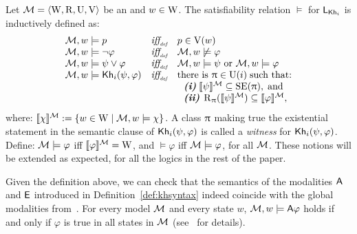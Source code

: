 \begin{definition}\label{def:sem-esm}
Let $\mathcal{M}=\langle \operatorname{W},\operatorname{R},\operatorname{U},\operatorname{V} \rangle$ be an \ults and $w \in \operatorname{W}$.
The satisfiability relation $\models$ for $\mathsf{L}_{{\sf Kh}_i}$ is inductively defined as:
\[
\begin{array}{l@{\ \ \ }c@{\ \ \  }l}
\modults, w \models p & \iffdef & p \in \V(w) \\
\modults, w \models \neg\varphi & \iffdef & \modults, w \not\models \varphi \\
\modults, w \models \psi\vee\varphi & \iffdef & \modults, w \models \psi \mbox{ or }\modults, w \models \varphi \\
\modults, w \models \khi(\psi,\varphi) & \iffdef & \text{there is } \plans \in \Unc(i) \;\text{such that:} \\
& & \ \ \text{\bfseries \itshape (i)} \; \truthset{\modults}{\psi} \subseteq \stexec(\plans),\; \text{and} \\
& & \ \ \text{\bfseries \itshape (ii)} \; \R_\plans(\truthset{\modults}{\psi}) \subseteq \truthset{\modults}{\varphi},
\end{array}
\]
where: $\llbracket \chi \rrbracket^{\mathcal{M}} := \{ w\in\operatorname{W} \mid \mathcal{M},w\models\chi \}$. 
A class $\uppi$ making true the existential statement in the semantic clause of ${\sf Kh}_i(\psi,\varphi)$ is called a \emph{witness} for ${\sf Kh}_i(\psi,\varphi)$. 
Define: $\mathcal{M}\models\varphi$ iff  $\llbracket \varphi \rrbracket^{\mathcal{M}}=\operatorname{W}$, and $\models\varphi$ iff $\mathcal{M}\models\varphi$, for all \ults $\mathcal{M}$. These notions will be extended as expected, for all the logics in the rest of the paper.
\end{definition}

\medskip

Given the definition above, we can check that the semantics of the modalities ${\sf A}$ and ${\sf E}$ introduced in Definition~\ref{def:khsyntax} indeed coincide with the global modalities from~\cite{GorankoP92}. For every model $\mathcal{M}$ and every state $w$, $\mathcal{M},w\models{\sf A}\varphi$ holds if and only if $\varphi$ is true in all states in $\mathcal{M}$ (see~\cite{AFSVQ21,AFSVQ23report} for details). %

\medskip


